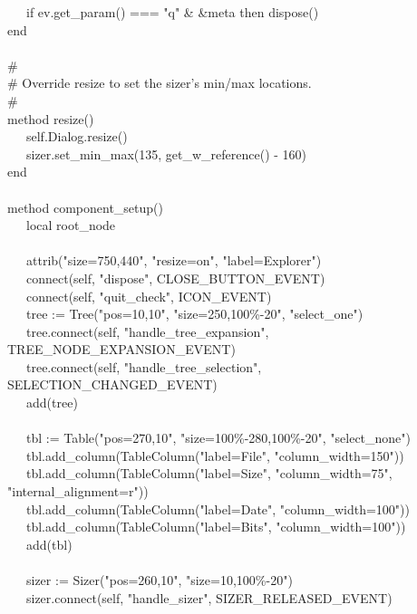 {\>   \ \ \ if ev.get\_param() === "q" \&
\&meta then dispose() \\
\>   end \\
\ \\
\>   \# \\
\>   \# Override resize to set the sizer's min/max
locations. \\
\>   \# \\
\>   method resize() \\
\>   \ \ \ self.Dialog.resize() \\
\>   \ \ \ sizer.set\_min\_max(135, get\_w\_reference() - 160) \\
\>   end \\
\ \\
\>   method component\_setup() \\
\>   \ \ \ local root\_node \\
\ \\
\>   \ \ \ attrib("size=750,440",
"resize=on",
"label=Explorer") \\
\>   \ \ \ connect(self, "dispose",
CLOSE\_BUTTON\_EVENT) \\
\>   \ \ \ connect(self, "quit\_check",
ICON\_EVENT) \\
\>   \ \ \ tree := Tree("pos=10,10",
"size=250,100\%-20",
"select\_one") \\
\>   \ \ \ tree.connect(self,
"handle\_tree\_expansion",
TREE\_NODE\_EXPANSION\_EVENT) \\
\>   \ \ \ tree.connect(self,
"handle\_tree\_selection",
SELECTION\_CHANGED\_EVENT) \\
\>   \ \ \ add(tree) \\
\ \\
\>   \ \ \ tbl := Table("pos=270,10",
"size=100\%-280,100\%-20",
"select\_none") \\
\>   \ \ \ tbl.add\_column(TableColumn("label=File",
"column\_width=150")) \\
\>   \ \ \ tbl.add\_column(TableColumn("label=Size",
"column\_width=75",
"internal\_alignment=r")) \\
\>   \ \ \ tbl.add\_column(TableColumn("label=Date",
"column\_width=100")) \\
\>   \ \ \ tbl.add\_column(TableColumn("label=Bits",
"column\_width=100")) \\
\>   \ \ \ add(tbl) \\
\ \\
\>   \ \ \ sizer := Sizer("pos=260,10",
"size=10,100\%-20") \\
\>   \ \ \ sizer.connect(self,
"handle\_sizer", SIZER\_RELEASED\_EVENT) \\
}
